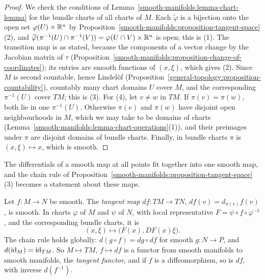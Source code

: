 \begin{proof}
We check the conditions of Lemma~\ref{smooth-manifolds:lemma-chart-lemma} for the bundle charts of all charts of $M$. Each $\widetilde{\varphi}$ is a
bijection onto the open set $\varphi(U) \times \mathbb{R}^n$ by Proposition~\ref{smooth-manifolds:proposition-tangent-space}(2), and
$\widetilde{\varphi}(\pi^{-1}(U) \cap \pi^{-1}(V)) = \varphi(U \cap V) \times \mathbb{R}^n$ is open; this is (1). The transition map is as stated, because the components
of a vector change by the Jacobian matrix of $\tau$ (Proposition~\ref{smooth-manifolds:proposition-change-of-coordinates}); its entries are smooth functions of
$(x, \xi)$, which gives (2). Since $M$ is second countable, hence Lindel\"of (Proposition~\ref{general-topology:proposition-countability}), countably many chart
domains $U$ cover $M$, and the corresponding $\pi^{-1}(U)$ cover $TM$; this is (3). For (4), let $v \neq w$ in $TM$. If $\pi(v) = \pi(w)$, both lie in one
$\pi^{-1}(U)$. Otherwise $\pi(v)$ and $\pi(w)$ have disjoint open neighbourhoods in $M$, which we may take to be domains of charts
(Lemma~\ref{smooth-manifolds:lemma-chart-operations}(1)), and their preimages under $\pi$ are disjoint domains of bundle charts. Finally, in bundle charts
$\pi$ is $(x, \xi) \mapsto x$, which is smooth.
\end{proof}

The differentials of a smooth map at all points fit together into one smooth map, and the chain rule of
Proposition~\ref{smooth-manifolds:proposition-tangent-space}(3) becomes a statement about these maps.

\begin{proposition}\label{smooth-manifolds:proposition-tangent-map}
Let $f \colon M \to N$ be smooth. The \emph{tangent map} $df \colon TM \to TN$, $df(v) = d_{\pi(v)}f(v)$, is smooth. In charts $\varphi$ of $M$ and $\psi$ of $N$,
with local representative $F = \psi \circ f \circ \varphi^{-1}$, and the corresponding bundle charts, it is
\[
(x, \xi) \mapsto \bigl(F(x), DF(x)\xi\bigr).
\]
The chain rule holds globally: $d(g \circ f) = dg \circ df$ for smooth $g \colon N \to P$, and $d(\mathrm{id}_M) = \mathrm{id}_{TM}$. So $M \mapsto TM$, $f \mapsto df$ is a functor
from smooth manifolds to smooth manifolds, the \emph{tangent functor}, and if $f$ is a diffeomorphism, so is $df$, with inverse $d(f^{-1})$.
\end{proposition}

